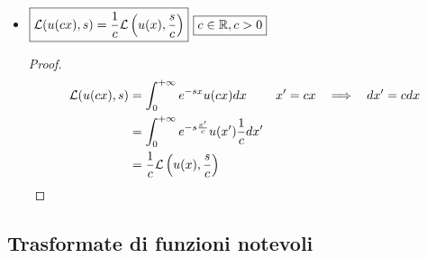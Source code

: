 \begin{itemize}
\begin{proof}
\begin{equation*}
\Lc\left(e^{s_{0} x} u(x), s\right) = \int^{+ \infty}_{0} e^{- x(s - s_{0})} u(x) dx = \Lc(u(x), s - s_{0})
\end{equation*}
\end{proof}
\item $\boxed{\mathcal{L}(u(cx), s) = \frac{1}{c}\mathcal{L}\left(u(x), \frac{s}{c}\right)}$ $\boxed{c\in \mathbb{R}, c > 0}$

\begin{proof}
\begin{equation*}
\begin{aligned}
\mathcal{L}(u(cx), s) & = \int^{+ \infty}_{0} e^{- sx} u(cx) dx & x' = cx\ \ \implies \ \ dx' = cdx\\
 & = \int^{+ \infty}_{0} e^{- s\frac{x'}{c}} u(x')\frac{1}{c} dx' & \\
 & = \frac{1}{c}\mathcal{L}\left(u(x), \frac{s}{c}\right) &
\end{aligned}
\end{equation*}
\end{proof}
\end{itemize}

\subsection{Trasformate di funzioni notevoli}

